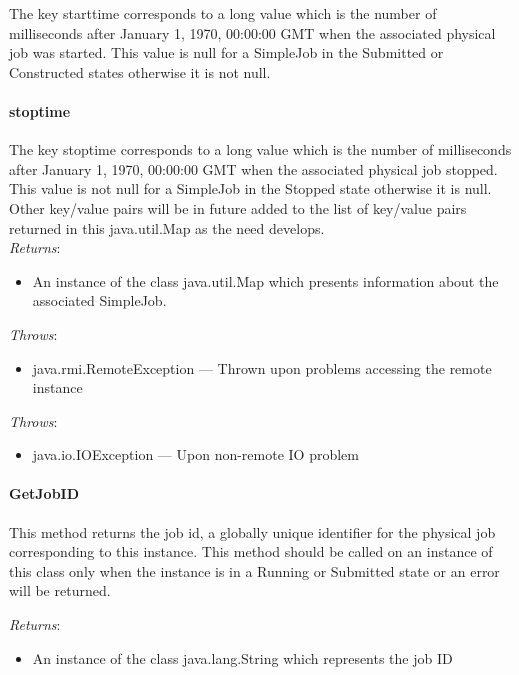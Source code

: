 \documentclass[$Date: 2003/06/26 19:29:31 $]{glabarticle}
\begin{document}
The key starttime corresponds to a long value which is the
number of milliseconds after January 1, 1970, 00:00:00 GMT when the
associated physical job was started. This value is null for a
SimpleJob in the Submitted or Constructed states otherwise it is not
null.

\paragraph{stoptime} 

The key stoptime corresponds to a long value which is the
number of milliseconds after January 1, 1970, 00:00:00 GMT when the
associated physical job stopped. This value is not null for a
SimpleJob in the Stopped state otherwise it is null. \\

Other key/value pairs will be in future added to the list of key/value
pairs returned in this java.util.Map as the need develops. \\

 \textit{Returns}:
 \begin{itemize}
 \item[] An instance of the class java.util.Map which presents information about the associated SimpleJob.
 \end{itemize} 

 \textit{Throws}:
 \begin{itemize}
 \item[] java.rmi.RemoteException --- Thrown upon problems accessing the remote instance 
 \end{itemize}
 
 \textit{Throws}:
\begin{itemize}
\item[] java.io.IOException --- Upon non-remote IO problem 
\end{itemize}
 
  \paragraph{GetJobID}
 
 This method returns the job id, a globally unique identifier for the physical
 job corresponding to this instance. This method should be called on an instance
 of this class only when the instance is in a Running or Submitted state or an
 error will be returned. 
 
  \textit{Returns}:
 \begin{itemize}
 \item[] An instance of the class java.lang.String which represents the job ID
 \end{itemize}
 
\end{document}
